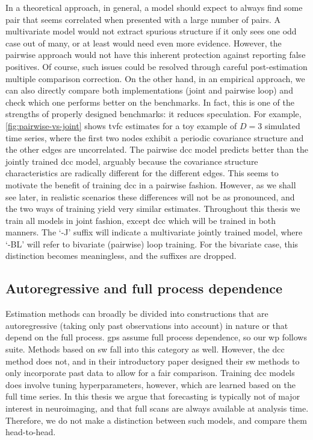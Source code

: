 In a theoretical approach, in general, a model should expect to always find some pair that seems correlated when presented with a large number of pairs.
A multivariate model would not extract spurious structure if it only sees one odd case out of many, or at least would need even more evidence.
However, the pairwise approach would not have this inherent protection against reporting false positives.
Of course, such issues could be resolved through careful post-estimation multiple comparison correction.
%
On the other hand, in an empirical approach, we can also directly compare both implementations (joint and pairwise loop) and check which one performs better on the benchmarks.
In fact, this is one of the strengths of properly designed benchmarks: it reduces speculation.
For example, \cref{fig:pairwise-vs-joint} shows \gls{tvfc} estimates for a toy example of $D = 3$ simulated time series, where the first two nodes exhibit a periodic covariance structure and the other edges are uncorrelated.
The pairwise \gls{dcc} model predicts better than the jointly trained \gls{dcc} model, arguably because the covariance structure characteristics are radically different for the different edges.
This seems to motivate the benefit of training \gls{dcc} in a pairwise fashion.
However, as we shall see later, in realistic scenarios these differences will not be as pronounced, and the two ways of training yield very similar estimates.
%
Throughout this thesis we train all models in joint fashion, except \gls{dcc} which will be trained in both manners.
The `-J' suffix will indicate a multivariate jointly trained model, where `-BL' will refer to bivariate (pairwise) loop training.
For the bivariate case, this distinction becomes meaningless, and the suffixes are dropped.

\subsection{Autoregressive and full process dependence}

Estimation methods can broadly be divided into constructions that are autoregressive (taking only past observations into account) in nature or that depend on the full process.
%
\Glspl{gp} assume full process dependence, so our \gls{wp} follows suite.
Methods based on \gls{sw} fall into this category as well.
%
However, the \gls{dcc} method does not, and in their introductory paper \textcite{Lindquist2014} designed their \gls{sw} methods to only incorporate past data to allow for a fair comparison.
Training \gls{dcc} models does involve tuning hyperparameters, however, which are learned based on the full time series.
%
In this thesis we argue that forecasting is typically not of major interest in neuroimaging, and that full scans are always available at analysis time.
Therefore, we do not make a distinction between such models, and compare them head-to-head.


